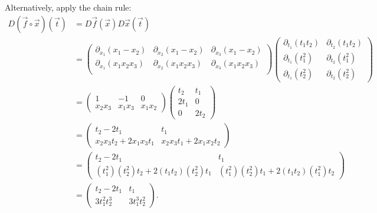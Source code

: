 \documentclass{multi}
\begin{document}
Alternatively, apply the chain rule:
\begin{align*}
    D(\vec f \circ \vec x)(\vec t) &= D\vec f(\vec x) D\vec x(\vec t) \\
        &=
        \begin{pmatrix}
            \partial_{x_1} (x_1 - x_2) & \partial_{x_2} (x_1 - x_2) & \partial_{x_3} (x_1 - x_2) \\
            \partial_{x_1} (x_1 x_2 x_3) & \partial_{x_2} (x_1 x_2 x_3) & \partial_{x_3} (x_1 x_2 x_3) \\
        \end{pmatrix}
        \begin{pmatrix}
            \partial_{t_1} (t_1 t_2) & \partial_{t_2} (t_1 t_2) \\
            \partial_{t_1} (t_1^2) & \partial_{t_2} (t_1^2) \\
            \partial_{t_1} (t_2^2) & \partial_{t_2} (t_2^2)
        \end{pmatrix} \\
        &=
        \begin{pmatrix}
            1 & -1 & 0 \\
            x_2 x_3 & x_1 x_3 & x_1 x_2
        \end{pmatrix}
        \begin{pmatrix}
            t_2 & t_1 \\
            2 t_1 & 0 \\
            0 & 2 t_2
        \end{pmatrix} \\
        &= 
        \begin{pmatrix}
            t_2 - 2 t_1 & t_1 \\
            x_2 x_3 t_2 + 2 x_1 x_3 t_1 & x_2 x_3 t_1 + 2 x_1 x_2 t_2
        \end{pmatrix} \\
        &=
        \begin{pmatrix}
            t_2 - 2 t_1 & t_1 \\
            (t_1^2) (t_2^2) t_2 + 2 (t_1 t_2) (t_2^2) t_1 & (t_1^2) (t_2^2) t_1 + 2 (t_1 t_2) (t_1^2) t_2
        \end{pmatrix} \\
        &=
        \begin{pmatrix}
            t_2 - 2 t_1 & t_1 \\
            3 t_1^2 t_2^3 & 3 t_1^3 t_2^2
        \end{pmatrix}.
\end{align*}
\end{document}
